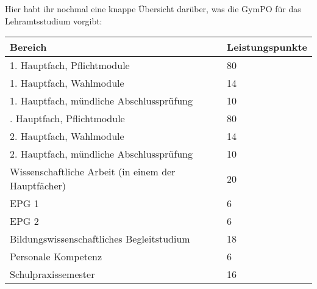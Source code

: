 Hier habt ihr nochmal eine knappe Übersicht darüber, was die \gls{GymPO} für das Lehramtsstudium vorgibt:

\begin{table*}[htb]
\centering

\begin{tabular}{ll}
  \toprule
  Bereich  & Leistungspunkte\\
  \midrule
  1. Hauptfach, Pflichtmodule & 80\\
  1. Hauptfach, Wahlmodule & 14\\
  1. Hauptfach, mündliche Abschlussprüfung & 10\\
  \addlinespace
  2. Hauptfach, Pflichtmodule & 80\\
  2. Hauptfach, Wahlmodule & 14\\
  2. Hauptfach, mündliche Abschlussprüfung & 10\\
  \addlinespace
  Wissenschaftliche Arbeit (in einem der Hauptfächer) & 20\\
  \addlinespace
  \gls{EPG} 1 & \phantom{0}6\\
  \gls{EPG} 2 & \phantom{0}6\\
  Bildungswissenschaftliches Begleitstudium & 18\\
  Personale Kompetenz & \phantom{0}6\\
  Schulpraxissemester & 16\\
  \bottomrule
\end{tabular}

\end{table*}

